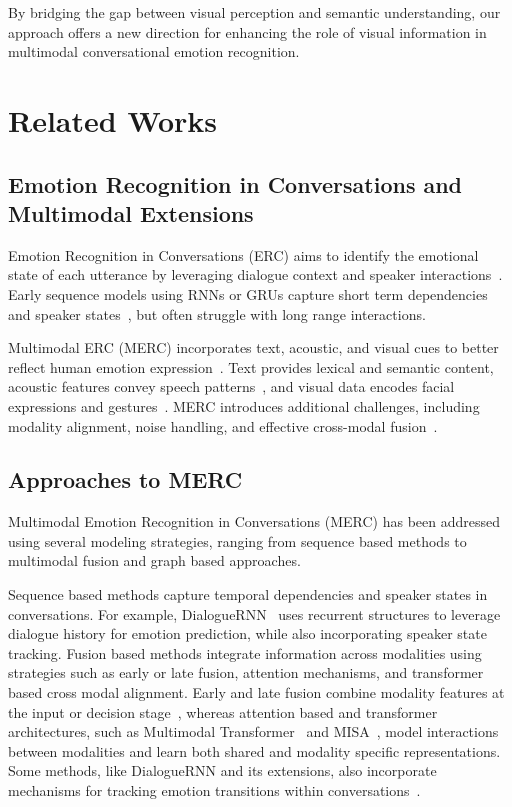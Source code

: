 \documentclass[runningheads]{llncs}
\begin{document}
By bridging the gap between visual perception and semantic understanding, our approach offers a new direction for enhancing the role of visual information in multimodal conversational emotion recognition.

\section{Related Works}

\subsection{Emotion Recognition in Conversations and Multimodal Extensions}

Emotion Recognition in Conversations (ERC) aims to identify the emotional state of each utterance by leveraging dialogue context and speaker interactions~\cite{shou2025comprehensivesurveymultimodalconversational}. Early sequence models using RNNs or GRUs capture short term dependencies and speaker states~\cite{majumder2019dialoguernn,hazarika2018icon}, but often struggle with long range interactions. 

Multimodal ERC (MERC) incorporates text, acoustic, and visual cues to better reflect human emotion expression~\cite{poria2019meld,zadeh2018multimodal}. Text provides lexical and semantic content, acoustic features convey speech patterns~\cite{schuller2011recognising}, and visual data encodes facial expressions and gestures~\cite{li2018self}. MERC introduces additional challenges, including modality alignment, noise handling, and effective cross-modal fusion~\cite{shou2025comprehensivesurveymultimodalconversational}.
\subsection{Approaches to MERC}

Multimodal Emotion Recognition in Conversations (MERC) has been addressed using several modeling strategies, ranging from sequence based methods to multimodal fusion and graph based approaches.

Sequence based methods capture temporal dependencies and speaker states in conversations. For example, DialogueRNN~\cite{majumder2019dialoguernn} uses recurrent structures to leverage dialogue history for emotion prediction, while also incorporating speaker state tracking. Fusion based methods integrate information across modalities using strategies such as early or late fusion, attention mechanisms, and transformer based cross modal alignment. Early and late fusion combine modality features at the input or decision stage~\cite{morency2011multimodal,perezrosas2013utterance,poria2016fusing,zadeh2016mosi}, whereas attention based and transformer architectures, such as Multimodal Transformer~\cite{tsai2019mult} and MISA~\cite{hazarika2020misa}, model interactions between modalities and learn both shared and modality specific representations. Some methods, like DialogueRNN and its extensions, also incorporate mechanisms for tracking emotion transitions within conversations~\cite{majumder2019dialoguernn,hazarika2018icon}.
\end{document}
